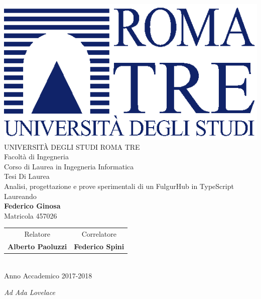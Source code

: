 \documentclass[12pt,italian,]{book}
\author{menxit}
\date{}
\begin{document}
\newcommand{\frontespizio}{
   \thispagestyle{empty}
   \begin{center}
      \vspace{10mm}
      {\includegraphics[width=0.4 \linewidth]{template/uniroma3-logo}} \\
      \vspace{10mm}
      {\Large UNIVERSIT\`A DEGLI STUDI ROMA TRE} \\
      \vspace{5mm}
      {\LARGE {Facoltà di Ingegneria}} \\
      {\Large {Corso di Laurea in Ingegneria Informatica}} \\
      \vspace{15mm}
      {\LARGE Tesi Di Laurea} \\
      \vspace{15mm}
      {\LARGE {Analisi, progettazione e prove sperimentali di un FulgurHub in TypeScript}} \\
      \vspace{15mm}
      {\large Laureando \\  \textbf{{Federico Ginosa}} \\ Matricola {457026}} \\
      \vspace{7mm}

      \begin{tabular}{c  @{\hspace{2.5cm}} c}
        Relatore & Correlatore \\
        \textbf{{Alberto Paoluzzi}} & \textbf{{Federico Spini}} \\
      \end{tabular} \\

      \vfill
      {\large Anno Accademico {2017-2018}} \\
   \end{center}
   \newpage 
}
{
\frontespizio
}

\newcommand{\generaDedica}{
   \thispagestyle{empty}
   \null\vspace{\stretch{1}}
   \begin{flushright}
      \emph{{{Ad Ada Lovelace}}}
   \end{flushright}
   \null
   \newpage
}
{
\generaDedica
}
\end{document}
